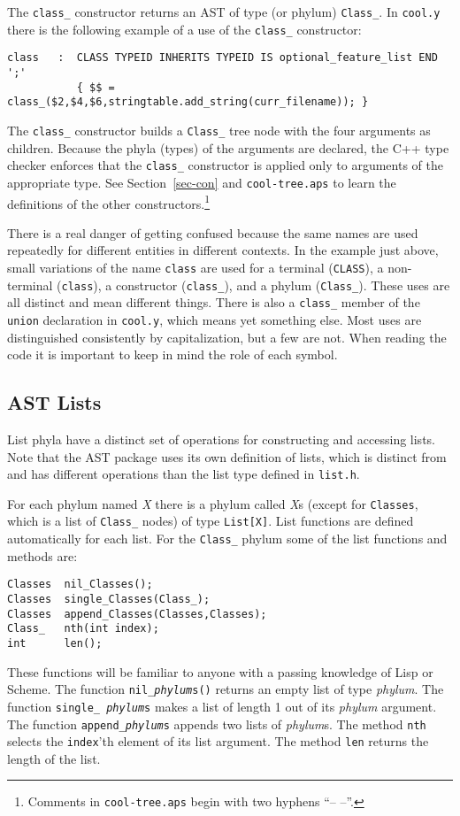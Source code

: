 The {\tt class\_} constructor returns an AST of type
(or phylum) {\tt Class\_}.  In {\tt cool.y} there is the following example of a
use of the {\tt class\_} constructor:
\begin{verbatim}
class   :  CLASS TYPEID INHERITS TYPEID IS optional_feature_list END ';'
           { $$ = class_($2,$4,$6,stringtable.add_string(curr_filename)); }
\end{verbatim}
The {\tt class\_} constructor builds a {\tt Class\_}  tree node with the
four arguments as children.  Because the phyla (types) of the arguments
are declared, the C++ type checker enforces that the {\tt class\_} constructor is 
applied only to arguments of the appropriate type.
See Section~\ref{sec-con} and {\tt cool-tree.aps}  to learn the definitions of the other constructors.\footnote{Comments in {\tt cool-tree.aps} begin with two hyphens ``-- --''.}

There is a real danger of getting confused because the same names are
used repeatedly for different entities in different contexts.  In the
example just above, small variations of the name {\tt class} are used
for a terminal ({\tt CLASS}), a non-terminal ({\tt class}), a constructor
({\tt class\_}), and a phylum ({\tt Class\_}).  These
uses are all distinct and mean different things.  There is
also a {\tt class\_} member of the {\tt union} declaration in
{\tt cool.y}, which means yet something else.  Most uses are
distinguished consistently by capitalization, but a few are not.
When reading the code it is important to keep in mind the role of each
symbol.


\subsection{AST Lists}
\label{sec-lists}

List phyla have a distinct set of operations for constructing and
accessing lists.  Note that the AST package uses its own definition of
lists, which is distinct from and has different operations than
the list type defined in {\tt list.h}.

For each phylum named {\em X}
there is a phylum called {\em X}s (except for {\tt Classes}, which is
a list of {\tt Class\_} nodes) of type {\tt List[X]}.  List functions are defined
automatically for each list.  For the {\tt Class\_} phylum some of the
list functions and methods are:
\begin{verbatim}
Classes  nil_Classes();
Classes  single_Classes(Class_);
Classes  append_Classes(Classes,Classes);
Class_   nth(int index);
int      len();
\end{verbatim}
These functions will be familiar to anyone with a passing knowledge of
Lisp or Scheme.  The function {\tt nil\_{\em phylum}s()} returns an
empty list of type {\em phylum}.  The function {\tt single\_{\em
phylum}s} makes a list of length 1 out of its {\em phylum}
argument. The function {\tt append\_{\em phylum}s} appends two lists of
{\em phylum}s.  The method {\tt nth} selects the {\tt index}'th element of
its list argument.  The method {\tt len} returns the length of the list.

